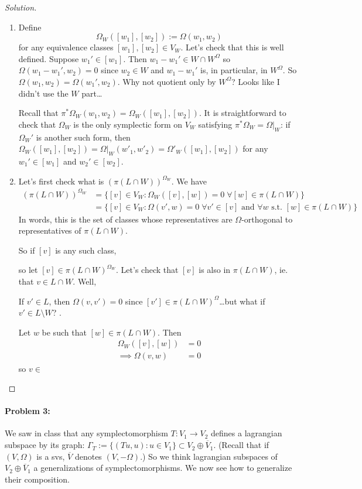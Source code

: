 \begin{proof}[Solution]\leavevmode 
	\begin{enumerate}[label=\alph*.]
		\item Define
			\[\Omega_{W}([w_1],[w_2]):=\Omega(w_1,w_2)\]
			for any equivalence classes $[w_1],[w_2]\in V_{W}$. Let's check that this is well defined. Suppose $w_1'\in [w_1]$. Then $w_1-w_1'\in W\cap W^{\Omega}$ so $\Omega(w_1-w_1',w_2)=0$ since $w_2\in W$ and $w_1-w_1'$ is, in particular, in $W^{\Omega}$. So $\Omega(w_1,w_2)=\Omega(w_1',w_2)$. {\color{magenta}Why not quotient only by $W^{\Omega}$? Looks like I didn't use the $W$ part…}

			Recall that $\pi^{*} \Omega_{W}(w_1,w_2)=\Omega_{W}([w_1],[w_2])$. It is straightforward to check that $\Omega_{W}$ is the only symplectic form on $V_{W}$ satisfying $\pi^{*} \Omega_{W}=\Omega|_{W}$: if $\Omega_{W}'$ is another such form, then $\Omega_{W}([w_1],[w_2])=\Omega|_{W}(w'_1,w'_2)=\Omega'_{W}([w_1],[w_2])$ for any $w_1'\in [w_1]$ and $w_2'\in [w_2]$.

			\item 
Let's first check what is $(\pi(L\cap W))^{\Omega_W}$. We have
\begin{align*}
	(\pi(L\cap W))^{\Omega_{W}}& =\{[v]\in V_{W}:\Omega_{W}([v],[w])=0\;\forall [w]\in \pi(L\cap W)\}\\
			     & =\{[v]\in V_{W}:\Omega(v',w)=0\;\forall v'\in [v]\text{ and } \forall  w\text{ s.t. }[w]\in \pi(L\cap W) \} 
	\end{align*}
In words, this is the set of classes whose representatives are $ \Omega $-orthogonal to representatives of $\pi(L\cap W)$.

So if $[v]$ is any such class,

	so let $[v]\in \pi(L\cap W)^{\Omega_{W}}$. Let's check that $[v]$ is also in $\pi(L\cap W)$, ie. that $v\in L\cap W$. Well, 


	If $v'\in L$, then $\Omega(v,v')=0$ {\color{magenta}since  $[v']\in \pi(L\cap W)^{\Omega}$…but what if  $v'\in L\setminus W$? }.

	Let $w$ be such that  $[w]\in \pi(L\cap W)$. Then
	\begin{align*}
		\Omega_{W}([v],[w])&=0\\
		\implies \Omega(v,w)&=0
\end{align*}
so $v\in $
\end{enumerate}
\end{proof}

\paragraph{Problem 3:}  We saw in class that any symplectomorphism $T:V_1\to V_2$ defines a lagrangian subspace by its graph: $\Gamma_{T}:=\{(Tu,u):u\in V_1 \}\subset V_2\oplus \overline{V}_{1}$. (Recall that if $(V,\Omega)$ is a svs,  $\overline{V}$ denotes $(V,-\Omega)$.) So we think lagrangian subspaces of $V_2\oplus \overline{V}_{1}$ a generalizations of symplectomorphisms. We now see how to generalize their composition. 

